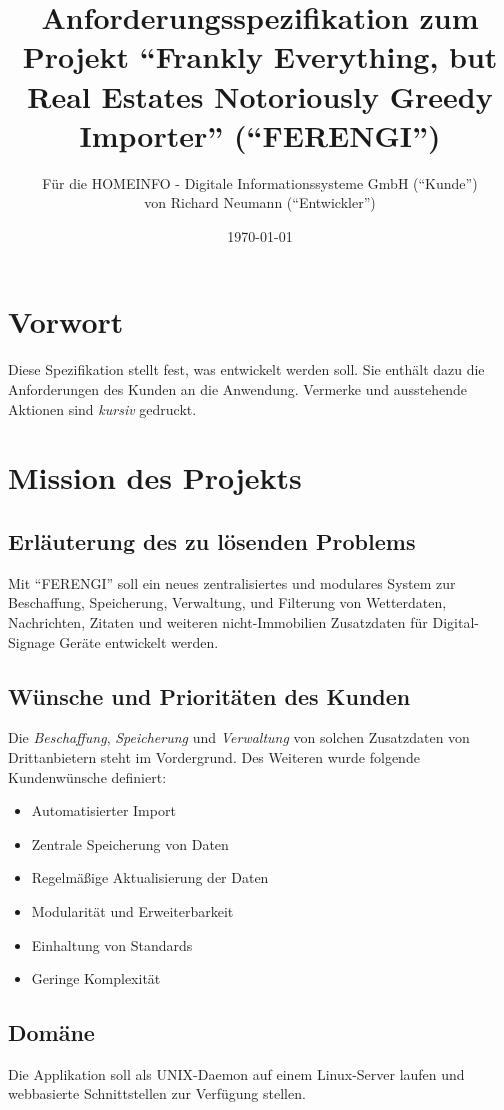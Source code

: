 \documentclass[a4paper]{article}
\title{Anforderungsspezifikation zum Projekt \newline \enquote{Frankly Everything, but Real Estates Notoriously Greedy Importer} (\enquote{FERENGI})}
\author{Für die HOMEINFO - Digitale Informationssysteme GmbH (\enquote{Kunde}) \\ 
	von Richard Neumann (\enquote{Entwickler})}
\date{\today}
\begin{document}
	
	\maketitle
	\pagebreak
	
	\tableofcontents
	\pagebreak
	
	\section*{Vorwort}
	Diese Spezifikation stellt fest, was entwickelt werden soll. Sie enthält dazu die Anforderungen des Kunden an die Anwendung.
	Vermerke und ausstehende Aktionen sind \emph{kursiv} gedruckt.
	
	\pagebreak
	\section{Mission des Projekts}
	\subsection{Erläuterung des zu lösenden Problems}
	Mit \enquote{FERENGI} soll ein neues zentralisiertes und modulares System zur Beschaffung, Speicherung, Verwaltung, und Filterung von Wetterdaten, Nachrichten, Zitaten und weiteren nicht-Immobilien Zusatzdaten für Digital-Signage Geräte entwickelt werden. 
	\subsection{Wünsche und Prioritäten des Kunden}
	Die \emph{Beschaffung}, \emph{Speicherung} und \emph{Verwaltung} von solchen Zusatzdaten von Drittanbietern steht im Vordergrund.
	Des Weiteren wurde folgende Kundenwünsche definiert:
	\begin{itemize}
		\item Automatisierter Import
		\item Zentrale Speicherung von Daten
		\item Regelmäßige Aktualisierung der Daten
		\item Modularität und Erweiterbarkeit
		\item Einhaltung von Standards
		\item Geringe Komplexität
	\end{itemize}
		
	\subsection{Domäne}
	Die Applikation soll als UNIX-Daemon auf einem Linux-Server laufen und webbasierte Schnittstellen zur Verfügung stellen.
	
\end{document}

